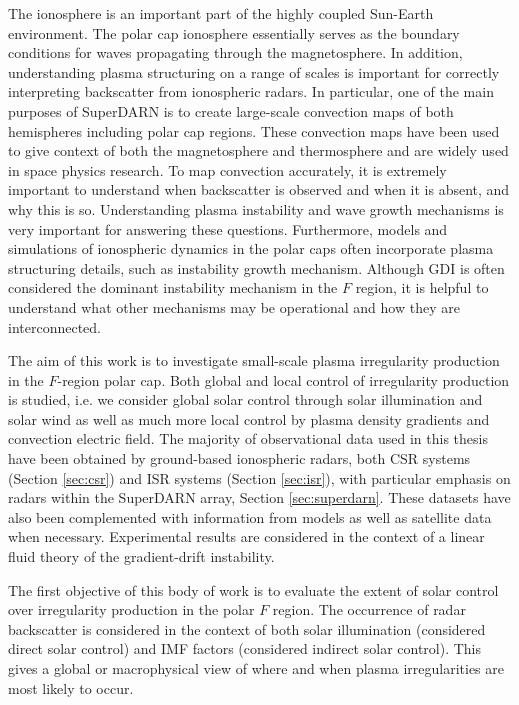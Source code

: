 The ionosphere is an important part of the highly coupled Sun-Earth environment.  The polar cap ionosphere essentially serves as the boundary conditions for waves propagating through the magnetosphere.  In addition, understanding plasma structuring on a range of scales is important for correctly interpreting backscatter from ionospheric radars.  In particular, one of the main purposes of SuperDARN is to create large-scale convection maps of both hemispheres including polar cap regions.  These convection maps have been used to give context of both the magnetosphere and thermosphere and are widely used in space physics research.  To map convection accurately, it is extremely important to understand when backscatter is observed and when it is absent, and why this is so.  Understanding plasma instability and wave growth mechanisms is very important for answering these questions.  Furthermore, models and simulations of ionospheric dynamics in the polar caps often incorporate plasma structuring details, such as instability growth mechanism.  Although GDI is often considered the dominant instability mechanism in the \(F\) region, it is helpful to understand what other mechanisms may be operational and how they are interconnected.

The aim of this work is to investigate small-scale plasma irregularity production in the \(F\)-region polar cap.  Both global and local control of irregularity production is studied, i.e. we consider global solar control through solar illumination and solar wind as well as much more local control by plasma density gradients and convection electric field.  The majority of observational data used in this thesis have been obtained by ground-based ionospheric radars, both CSR systems (Section \ref{sec:csr}) and ISR systems (Section \ref{sec:isr}), with particular emphasis on radars within the SuperDARN array, Section \ref{sec:superdarn}.  These datasets have also been complemented with information from models as well as satellite data when necessary.  Experimental results are considered in the context of a linear fluid theory of the gradient-drift instability.

The first objective of this body of work is to evaluate the extent of solar control over irregularity production in the polar \(F\) region.  The occurrence of radar backscatter is considered in the context of both solar illumination (considered direct solar control) and IMF factors (considered indirect solar control).  This gives a global or macrophysical view of where and when plasma irregularities are most likely to occur.

